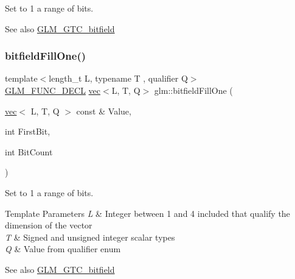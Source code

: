 Set to 1 a range of bits.

\begin{DoxySeeAlso}{See also}
\mbox{\hyperlink{group__gtc__bitfield}{G\+L\+M\+\_\+\+G\+T\+C\+\_\+bitfield}} 
\end{DoxySeeAlso}
\mbox{\label{group__gtc__bitfield_ga3e96dd1f0a4bc892f063251ed118c0c1}} 
\subsubsection{\texorpdfstring{bitfield\+Fill\+One()}{bitfieldFillOne()}\hspace{0.1cm}{\footnotesize\ttfamily [2/2]}}
{\footnotesize\ttfamily template$<$length\+\_\+t L, typename T , qualifier Q$>$ \\
\mbox{\hyperlink{setup_8hpp_ab2d052de21a70539923e9bcbf6e83a51}{G\+L\+M\+\_\+\+F\+U\+N\+C\+\_\+\+D\+E\+CL}} \mbox{\hyperlink{structglm_1_1vec}{vec}}$<$L, T, Q$>$ glm\+::bitfield\+Fill\+One (\begin{DoxyParamCaption}\item[{\mbox{\hyperlink{structglm_1_1vec}{vec}}$<$ L, T, Q $>$ const \&}]{Value,  }\item[{int}]{First\+Bit,  }\item[{int}]{Bit\+Count }\end{DoxyParamCaption})}

Set to 1 a range of bits.


\begin{DoxyTemplParams}{Template Parameters}
{\em L} & Integer between 1 and 4 included that qualify the dimension of the vector \\
\hline
{\em T} & Signed and unsigned integer scalar types \\
\hline
{\em Q} & Value from qualifier enum\\
\hline
\end{DoxyTemplParams}
\begin{DoxySeeAlso}{See also}
\mbox{\hyperlink{group__gtc__bitfield}{G\+L\+M\+\_\+\+G\+T\+C\+\_\+bitfield}} 
\end{DoxySeeAlso}
\mbox{\label{group__gtc__bitfield_ga697b86998b7d74ee0a69d8e9f8819fee}} 
